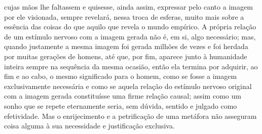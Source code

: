 cujas mãos lhe faltassem e quisesse, ainda assim, expressar pelo canto
a imagem por ele visionada, sempre revelará, nessa troca de esferas,
muito mais sobre a essência das coisas do que aquilo que revela o mundo
empírico. A própria relação de um estímulo nervoso com a imagem gerada
não é, em si, algo necessário; mas, quando justamente a mesma imagem
foi gerada milhões de vezes e foi herdada por muitas gerações de
homens, até que, por fim, aparece junto à humanidade inteira sempre na
sequência da mesma ocasião, então ela termina por adquirir, ao fim e ao
cabo, o mesmo significado para o homem, como se fosse a imagem
exclusivamente necessária e como se aquela relação do estímulo nervoso
original com a imagem gerada constituísse uma firme relação causal;
assim como um sonho que se repete eternamente seria, sem dúvida,
sentido e julgado como efetividade. Mas o enrijecimento e a
petrificação de uma metáfora não asseguram coisa alguma à sua
necessidade e justificação exclusiva.

